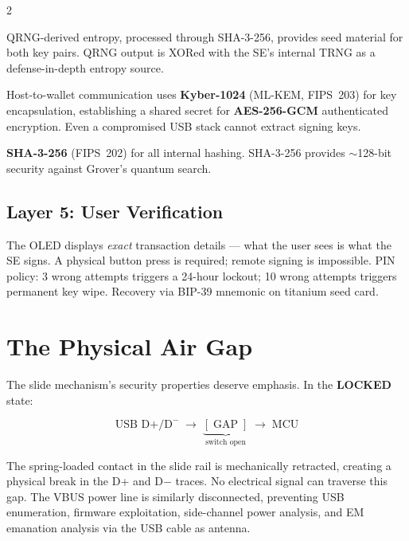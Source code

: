 \documentclass[11pt,a4paper]{article}
\begin{document}
\begin{multicols}{2}
\begin{description}[leftmargin=0.5em,itemsep=3pt]
  \item[Key generation:] QRNG-derived entropy, processed through
    SHA-3-256, provides seed material for both key pairs.
    QRNG output is XORed with the SE's internal TRNG
    as a defense-in-depth entropy source.

  \item[USB encryption:] Host-to-wallet communication uses
    \textbf{Kyber-1024} (ML-KEM, FIPS~203) for
    key encapsulation, establishing a shared secret for
    \textbf{AES-256-GCM} authenticated encryption. Even a
    compromised USB stack cannot extract signing keys.

  \item[Hashing:] \textbf{SHA-3-256} (FIPS~202) for all internal
    hashing. SHA-3-256 provides $\sim$128-bit security against
    Grover's quantum search.
\end{description}

\subsection{Layer 5: User Verification}

The OLED displays \emph{exact} transaction details --- what the
user sees is what the SE signs. A physical button press is required;
remote signing is impossible. PIN policy: 3 wrong attempts triggers
a 24-hour lockout; 10 wrong attempts triggers permanent key wipe.
Recovery via BIP-39 mnemonic on titanium seed card.

\section{The Physical Air Gap}

The slide mechanism's security properties deserve emphasis.
In the \textbf{LOCKED} state:

\begin{equation}
  \text{USB D+/D}^{-} \;\longrightarrow\; \underbrace{[\;\text{GAP}\;]}_{\text{switch open}} \;\longrightarrow\; \text{MCU}
\end{equation}

The spring-loaded contact in the slide rail is mechanically retracted,
creating a physical break in the D+ and D$-$ traces. No electrical
signal can traverse this gap. The VBUS power line is similarly
disconnected, preventing USB enumeration, firmware exploitation,
side-channel power analysis, and EM emanation analysis via the USB
cable as antenna.


\end{multicols}
\end{document}
